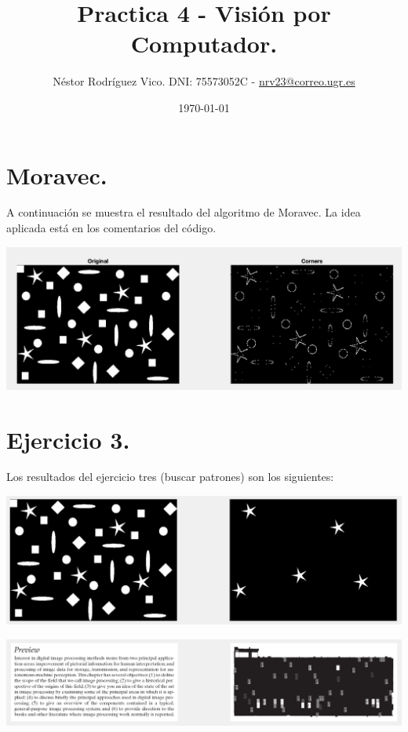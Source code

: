 \documentclass[12pt]{article}
\title{Practica 4 - Visión por Computador.}
\author{Néstor Rodríguez Vico. DNI: 75573052C - \href{mailto:nrv23@correo.ugr.es}{nrv23@correo.ugr.es}}
\date{\today}
\begin{document}
\maketitle

\setlength{\belowdisplayskip}{5pt} 
\setlength{\belowdisplayshortskip}{5pt}
\setlength{\abovedisplayskip}{5pt} 
\setlength{\abovedisplayshortskip}{5pt}

\section{Moravec.}

A continuación se muestra el resultado del algoritmo de Moravec. La idea aplicada está en los comentarios del código.

\includegraphics[width=\linewidth]{images/moravec.png}

\section{Ejercicio 3.}

Los resultados del ejercicio tres (buscar patrones) son los siguientes:

\includegraphics[width=\linewidth]{images/figuras.png}

\includegraphics[width=\linewidth]{images/letra_p.png}
\end{document}
